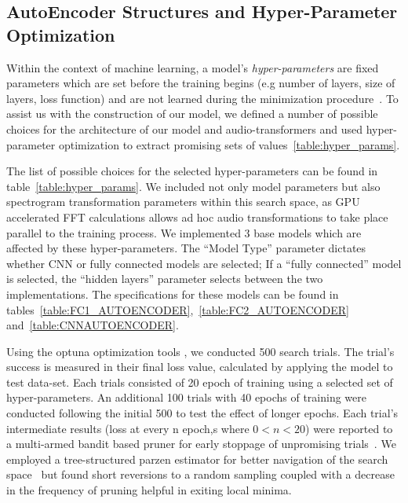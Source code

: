 \documentclass[runningheads,a4paper]{llncs}
\begin{document}
\begin{appendices}

\chapter{AutoEncoder Structures and Hyper-Parameter Optimization}
\label{appendix:hyperparam}
Within the context of machine learning, a model's \emph{hyper-parameters} are fixed parameters which are set before the training begins (e.g number of layers, size of layers, loss function) and are not learned during the minimization procedure~\cite{bengio2000gradient}. To assist us with the construction of our model, we defined a number of possible choices for the architecture of our model and audio-transformers and used hyper-parameter optimization to extract promising sets of values~\ref{table:hyper_params}. 

The list of possible choices for the selected hyper-parameters can be found in table~\ref{table:hyper_params}. We included not only model parameters but also spectrogram transformation parameters within this search space, as GPU accelerated FFT calculations allows ad hoc audio transformations to take place parallel to the training process. We implemented 3 base models which are affected by these hyper-parameters. The \enquote{Model Type} parameter dictates whether CNN or fully connected models are selected; If a \enquote{fully connected} model is selected, the \enquote{hidden layers} parameter selects between the two implementations. The specifications for these models can be found in tables~\ref{table:FC1_AUTOENCODER},~\ref{table:FC2_AUTOENCODER} and~\ref{table:CNNAUTOENCODER}.

Using the optuna optimization tools \cite{akiba2019optuna}, we conducted 500 search trials. The trial's success is measured in their final loss value, calculated by applying the model to test data-set. Each trials consisted of 20 epoch of training using a selected set of hyper-parameters. An additional 100 trials with 40 epochs of training were conducted following the initial 500 to test the effect of longer epochs. Each trial's intermediate results (loss at every n epoch,s where $0<n<20$) were reported to a multi-armed bandit based pruner for early stoppage of unpromising trials~\cite{li2017hyperband}. We employed a tree-structured parzen estimator for better navigation of the search space~\cite{bergstra2011algorithms,akiba2019optuna} but found short reversions to a random sampling coupled with a decrease in the frequency of pruning helpful in exiting local minima. \\
\begin{table}[htbp]


\end{table}
\end{appendices}
\end{document}
